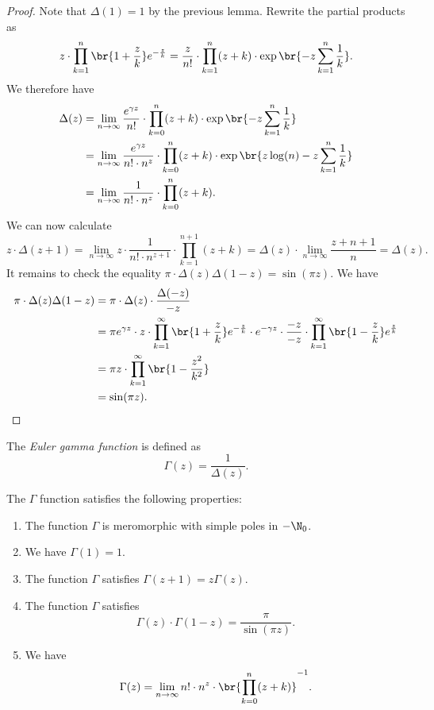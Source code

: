 \begin{proof}
Note that $\Delta(1) = 1$ by the previous lemma. Rewrite the
partial products as
\[
z \cdot \prod_{k=1}^n \br{1 + \frac{z}{k}} e^{-\frac{z}{k}} =
\frac{z}{n!} \cdot \prod_{k=1}^n (z+k) \cdot
\exp \br{-z \sum_{k=1}^n \frac{1}{k}}.
\]
We therefore have
\begin{align*}
\Delta(z) &=
\lim_{n \to \infty}
\frac{e^{\gamma z}}{n!} \cdot \prod_{k=0}^n (z+k) \cdot
\exp \br{-z \sum_{k=1}^n \frac{1}{k}}
\\
&=
\lim_{n \to \infty}
\frac{e^{\gamma z}}{n! \cdot n^z} \cdot \prod_{k=0}^n (z+k) \cdot
\exp \br{z \log(n) -z \sum_{k=1}^n \frac{1}{k}}
\\
&=
\lim_{n \to \infty}
\frac{1}{n! \cdot n^z} \cdot \prod_{k=0}^n (z+k).
\end{align*}
We can now calculate
\[
z \cdot \Delta(z+1) =
\lim_{n \to \infty}
z \cdot \frac{1}{n! \cdot n^{z+1}} \cdot \prod_{k=1}^{n+1} (z+k) =
\Delta(z) \cdot \lim_{n \to \infty} \frac{z + n + 1}{n} =
\Delta(z).
\]
It remains to check the equality
$\pi \cdot \Delta(z) \Delta(1-z) = \sin(\pi z)$. We have
\begin{align*}
\pi \cdot \Delta(z) \Delta(1-z) &=
\pi \cdot \Delta(z) \cdot \frac{\Delta(-z)}{-z}
\\
&=
\pi e^{\gamma z} \cdot z \cdot
\prod_{k=1}^\infty \br{1 + \frac{z}{k}} e^{-\frac{z}{k}} \cdot
e^{-\gamma z} \cdot \frac{-z}{-z} \cdot
\prod_{k=1}^\infty \br{1 - \frac{z}{k}} e^{\frac{z}{k}}
\\
&=
\pi z \cdot \prod_{k=1}^\infty \br{1 - \frac{z^2}{k^2}}
\\
&=
\sin(\pi z). \qedhere
\end{align*}
\end{proof}

\begin{definicija}
The \emph{Euler gamma function} is
defined as
\[
\Gamma(z) = \frac{1}{\Delta(z)}.
\]
\end{definicija}

\begin{izrek}
The $\Gamma$ function satisfies the following properties:

\begin{enumerate}
\item The function $\Gamma$ is meromorphic with simple poles in
$-\N_0$.
\item We have $\Gamma(1) = 1$.
\item The function $\Gamma$ satisfies $\Gamma(z+1) = z \Gamma(z)$.
\item The function $\Gamma$ satisfies
\[
\Gamma(z) \cdot \Gamma(1-z) = \frac{\pi}{\sin(\pi z)}.
\]
\item We have
\[
\Gamma(z) =
\lim_{n \to \infty}
n! \cdot n^z \cdot \br{\prod_{k=0}^n (z+k)}^{-1}.
\]
\end{enumerate}
\end{izrek}


